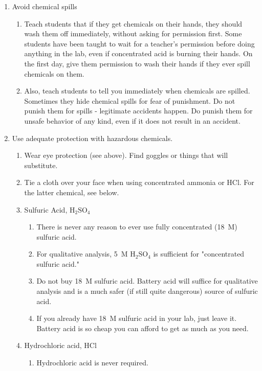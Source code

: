 \begin{enumerate}
\item{Avoid chemical spills}
\begin{enumerate}
\item Teach students that if they get chemicals on their hands, they should
wash them off immediately, without asking for permission first. Some
students have been taught to wait for a teacher's permission before
doing anything in the lab, even if concentrated acid is burning their
hands. On the first day, give them permission to wash their hands if
they ever spill chemicals on them.
\item Also, teach students to tell you immediately when chemicals are
spilled. Sometimes they hide chemical spills for fear of punishment.
Do not punish them for spills - legitimate accidents happen. Do punish
them for unsafe behavior of any kind, even if it does not result in an
accident. 
\end{enumerate}
\item{Use adequate protection with hazardous chemicals.}
\begin{enumerate}
\item{Wear eye protection (see above). 
Find goggles or things that will substitute.}
\item{Tie a cloth over your face when using concentrated ammonia or HCl. 
For the latter chemical, see below.}
\item{Sulfuric Acid, $\mbox{H}_{2}\mbox{SO}_{4}$}
\begin{enumerate}
\item{There is never any reason to ever use 
fully concentrated (18~M) sulfuric acid.}
\item{For qualitative analysis, 5~M $\mbox{H}_{2}\mbox{SO}_{4}$ 
is sufficient for "concentrated sulfuric acid."}
\item{Do not buy 18~M sulfuric acid. 
Battery acid will suffice for qualitative analysis 
and is a much safer (if still quite dangerous) source of sulfuric acid.}
\item{If you already have 18~M sulfuric acid in your lab, just leave it. 
Battery acid is so cheap you can afford to get as much as you need.}
\end{enumerate}
\item{Hydrochloric acid, HCl}
\begin{enumerate}
\item{Hydrochloric acid is never required.}

\end{enumerate}
\end{enumerate}
\end{enumerate}
